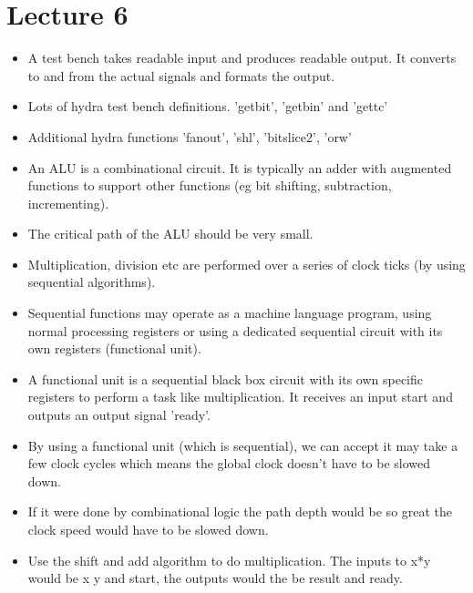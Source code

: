 \documentclass{article}
\begin{document}
\section*{Lecture 6}
\begin{itemize}
\item A test bench takes readable input and produces readable output. It converts to and from the actual signals and formats the output.
\item Lots of hydra test bench definitions. 'getbit', 'getbin' and 'gettc'
\item Additional hydra functions 'fanout', 'shl', 'bitslice2', 'orw'
\item An ALU is a combinational circuit. It is typically an adder with augmented functions to support other functions (eg bit shifting, subtraction, incrementing).
\item The critical path of the ALU should be very small.
\item Multiplication, division etc are performed over a series of clock ticks (by using sequential algorithms).
\item Sequential functions may operate as a machine language program, using normal processing registers or using a dedicated sequential circuit with its own registers (functional unit).
\item A functional unit is a sequential black box circuit with its own specific registers to perform a task like multiplication. It receives an input start and outputs an output signal 'ready'.
\item By using a functional unit (which is sequential), we can accept it may take a few clock cycles which means the global clock doesn't have to be slowed down.
\item If it were done by combinational logic the path depth would be so great the clock speed would have to be slowed down.
\item Use the shift and add algorithm to do multiplication. The inputs to x*y would be x y and start, the outputs would the be result and ready.

\end{itemize}
\end{document}
